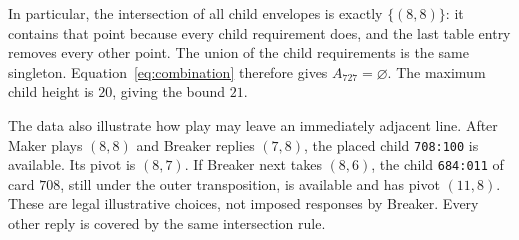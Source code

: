 In particular, the intersection of all child envelopes is exactly
$\{(8,8)\}$: it contains that point because every child requirement
does, and the last table entry removes every other point.
The union of the child requirements is the same singleton.
Equation~\eqref{eq:combination} therefore gives $A_{727}=\varnothing$.
The maximum child height is $20$, giving the bound $21$.

The data also illustrate how play may leave an immediately adjacent
line. After Maker plays $(8,8)$ and Breaker replies $(7,8)$, the
placed child \texttt{708:100} is available. Its pivot is $(8,7)$.
If Breaker next takes $(8,6)$, the child \texttt{684:011} of card
$708$, still under the outer transposition, is available and has
pivot $(11,8)$. These are legal illustrative choices, not imposed
responses by Breaker. Every other reply is covered by the same
intersection rule.
